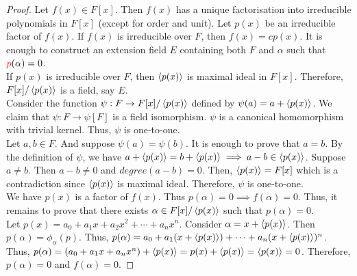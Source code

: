 \begin{proof}
	Let $f(x) \in F[x]$.
	Then $f(x)$ has a unique factorisation into irreducible polynomials in $F[x]$ (except for order and unit).
	Let $p(x)$ be an irreducible factor of $f(x)$.
	If $f(x)$ is irreducible over $F$, then $f(x) = cp(x)$.
	It is enough to construct an extension field $E$ containing both $F$ and $\alpha$ such that ${\color{red}p}(\alpha) = 0$.\\

	If $p(x)$ is irreducible over $F$, then $\left\langle p(x)\right\rangle$ is maximal ideal in $F[x]$.
	Therefore, $F[x]/\left\langle p(x)\right\rangle$ is a field, say $E$.\\

	Consider the function $\psi : F \to F[x]/\left\langle p(x)\right\rangle$ defined by $\psi(a) = a+\left\langle p(x)\right\rangle$.
	We claim that $\psi : F \to \psi[F]$ is a field isomorphism.
	$\psi$ is a canonical homomorphism with trivial kernel. Thus, $\psi$ is one-to-one.\\

	Let $a,b \in F$.
	And suppose $\psi(a) = \psi(b)$.
	It is enough to prove that $a = b$.
	By the definition of $\psi$, we have $a+\left\langle p(x)\right\rangle = b + \left\langle p(x)\right\rangle \implies a-b \in \left\langle p(x)\right\rangle$.
	Suppose $a \ne b$.
	Then $a-b \ne 0$ and $degree(a-b) = 0$.
	Then, $\left\langle p(x)\right\rangle = F[x]$ which is a contradiction since $\left\langle p(x)\right\rangle$ is maximal ideal.
	Therefore, $\psi$ is one-to-one.\\
	
	We have $p(x)$ is a factor of $f(x)$.
	Thus $p(\alpha) = 0 \implies f(\alpha) = 0$.
	Thus, it remains to prove that there exists $\alpha \in F[x]/\left\langle p(x)\right\rangle$ such that $p(\alpha) = 0$.\\

	Let $p(x) = a_0 + a_1x + a_2 x^2 + \dotsb + a_n x^n$.
	Consider $\alpha = x + \left\langle p(x)\right\rangle$.
	Then $p(\alpha) = \phi_\alpha(p)$.
	Thus, $p(\alpha) = a_0 + a_1(x+\left\langle p(x)\right\rangle) + \dotsb + a_n(x + \left\langle p(x)\right\rangle)^n$.
	Thus, $p(\alpha) = (a_0+a_1x + a_n x^n) + \left\langle p(x)\right\rangle = p(x) + \left\langle p(x)\right\rangle = \left\langle p(x)\right\rangle = 0$.
	Therefore, $p(\alpha) = 0$ and $f(\alpha) = 0$.
\end{proof}

